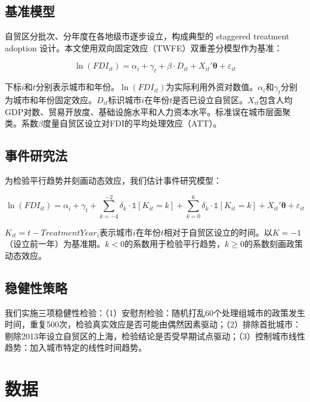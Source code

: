 \documentclass[12pt,a4paper]{article}
\begin{document}
\subsection{基准模型}

自贸区分批次、分年度在各地级市逐步设立，构成典型的 staggered treatment adoption 设计。本文使用双向固定效应（TWFE）双重差分模型作为基准：

\begin{equation}
\ln(FDI_{it}) = \alpha_i + \gamma_t + \beta \cdot D_{it} + X_{it}'\boldsymbol{\theta} + \varepsilon_{it}
\label{eq:twfe}
\end{equation}

下标$i$和$t$分别表示城市和年份。$\ln(FDI_{it})$为实际利用外资对数值。$\alpha_i$和$\gamma_t$分别为城市和年份固定效应。$D_{it}$标识城市$i$在年份$t$是否已设立自贸区。$X_{it}$包含人均GDP对数、贸易开放度、基础设施水平和人力资本水平。标准误在城市层面聚类。系数$\beta$度量自贸区设立对FDI的平均处理效应（ATT）。

\subsection{事件研究法}

为检验平行趋势并刻画动态效应，我们估计事件研究模型：

\begin{equation}
\ln(FDI_{it}) = \alpha_i + \gamma_t + \sum_{k=-4}^{-2} \delta_k \cdot \mathbb{1}[K_{it}=k] + \sum_{k=0}^{6} \delta_k \cdot \mathbb{1}[K_{it}=k] + X_{it}'\boldsymbol{\theta} + \varepsilon_{it}
\label{eq:event}
\end{equation}

$K_{it} = t - TreatmentYear_i$表示城市$i$在年份$t$相对于自贸区设立的时间。以$K=-1$（设立前一年）为基准期。$k<0$的系数用于检验平行趋势，$k\ge0$的系数刻画政策动态效应。

\subsection{稳健性策略}

我们实施三项稳健性检验：（1）安慰剂检验：随机打乱60个处理组城市的政策发生时间，重复500次，检验真实效应是否可能由偶然因素驱动；（2）排除首批城市：剔除2013年设立自贸区的上海，检验结论是否受早期试点驱动；（3）控制城市线性趋势：加入城市特定的线性时间趋势。

\section{数据}
\end{document}
